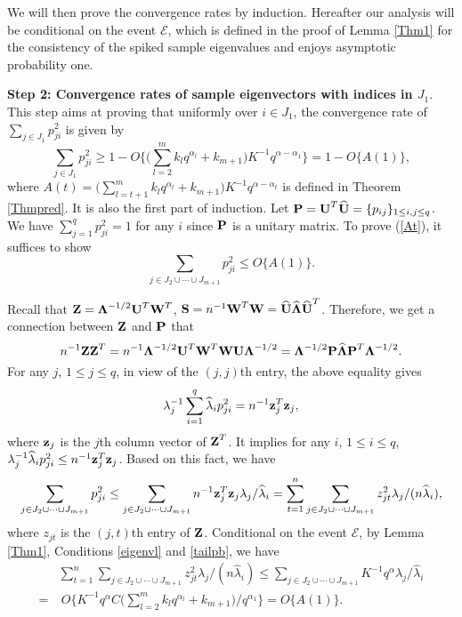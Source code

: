 \documentclass{statsoc}
\newcommand{\bz}{\mbox{\bf z}}
\newcommand{\bP}{\mbox{\bf P}}
\newcommand{\bS}{\mbox{\bf S}}
\newcommand{\bU}{\mbox{\bf U}}
\newcommand{\bW}{\mbox{\bf W}}
\newcommand{\bZ}{\mbox{\bf Z}}
\newcommand{\bLambda}{\mbox{\boldmath $\Lambda$}}
\def\t{^T}
\begin{document}
We will then prove the convergence rates by induction. Hereafter our analysis will be conditional on the event $\mathcal{E}$, which is defined in the proof of Lemma \ref{Thm1} for the consistency of the spiked sample eigenvalues and enjoys asymptotic probability one.

\medskip

\noindent \textbf{Step 2: Convergence rates of sample eigenvectors with indices in $J_1$}. This step aims at proving that uniformly over $i \in J_1$, the convergence rate of $\sum_{j \in J_1} p_{ji}^2$ is given by
\begin{equation} \label{At}
\sum_{j \in J_1} p_{ji}^2 \geq 1 - O\{\big(\sum_{l = 2}^m k_l q^{\alpha_l} + k_{m + 1} \big) K^{-1} q^{\alpha - \alpha_1}\} = 1 - O\{A(1)\},
\end{equation}
where $A(t) = \big(\sum_{l = t + 1}^m k_l q^{\alpha_l} + k_{m + 1} \big) K^{-1} q^{\alpha - \alpha_t}$ is defined in Theorem \ref{Thmpred}. It is also the first part of induction. Let $\bP = \bU\t \widehat{\bU} = \{p_{ij}\}_{1 \leq i,j \leq q}$. We have $\sum_{j = 1}^q p_{ji}^2 = 1$ for any $i$ since $\bP$ is a unitary matrix. To prove (\ref{At}), it suffices to show $$\sum_{j \in J_2 \cup \cdots \cup J_{m + 1}} p_{ji}^2 \leq O\{A(1)\}.$$

Recall that $\bZ = \bLambda^{-1/2}\bU\t \bW\t$, $\bS = n^{-1} \bW\t \bW  = \widehat{\bU}\widehat{\bLambda}\widehat{\bU}\t$. Therefore, we get a connection between $\bZ$ and $\bP$ that
\[n^{-1} \bZ \bZ\t = n^{-1} \bLambda^{-1/2} \bU\t \bW\t \bW \bU \bLambda^{-1/2} = \bLambda^{-1/2} \bP \widehat{\bLambda} \bP\t \bLambda^{-1/2}.\]
For any $j$, $1 \leq j \leq q$, in view of the $(j,j)$th entry, the above equality gives
\begin{equation} \label{pij}
\lambda_j^{-1}\sum_{i = 1}^q \widehat{\lambda}_i p_{ji}^2 = n^{-1}\bz_j\t \bz_j,
\end{equation}
where $\bz_j$ is the $j$th column vector of $\bZ\t$. It implies for any $i$, $1 \leq i \leq q$, $\lambda_j^{-1} \widehat{\lambda}_i p_{ji}^2 \leq n^{-1}\bz_j\t \bz_j$. Based on this fact, we have
\begin{equation} \label{equ1}
\sum_{j \in J_2 \cup \cdots \cup J_{m + 1}} p_{ji}^2 \leq \sum_{j \in J_2 \cup \cdots \cup J_{m + 1}} n^{-1}\bz_j\t \bz_j \lambda_j / \widehat{\lambda}_i = \sum_{t = 1}^n \sum_{j \in J_2 \cup \cdots \cup J_{m + 1}} z_{jt}^2 \lambda_j / (n \widehat{\lambda}_i),
\end{equation}
where $z_{jt}$ is the $(j,t)$th entry of $\bZ$. Conditional on the event $\mathcal{E}$, by Lemma \ref{Thm1}, Conditions \ref{eigenvl} and \ref{tailpb}, we have
\begin{align} \label{align1}
&\sum_{t = 1}^n  \sum_{j \in J_2 \cup \cdots \cup J_{m + 1}} z_{jt}^2 \lambda_j / (n \widehat{\lambda}_i) \leq \sum_{j \in J_2 \cup \cdots \cup J_{m + 1}} K^{-1} q^{\alpha} \lambda_j / \widehat{\lambda}_i \nonumber\\
= & \ O\{K^{-1} q^{\alpha} C \big(\sum_{l = 2}^m k_l q^{\alpha_l} + k_{m + 1}\big)/q^{\alpha_1}\} = O\{A(1)\}.
\end{align}
\end{document}

